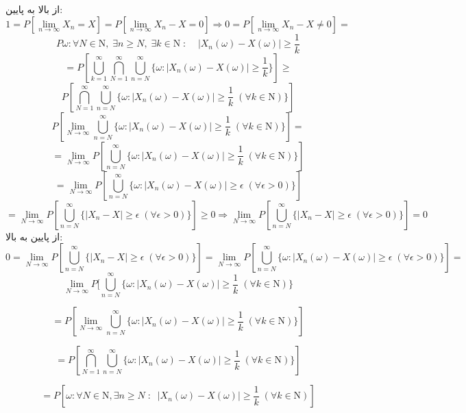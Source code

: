 از بالا به پایین:\small
\[
1= P[\lim_{n \longrightarrow \infty} X_n=X]=P[\lim_{n \longrightarrow \infty} X_n-X=0] \Longrightarrow 0=P[\lim_{n \longrightarrow \infty} X_n-X\neq0]=
\]
\[
P\omega :  \forall N \in \mathrm{N}, \;\exists n  \ge N,\;\exists k \in \mathrm{N}   \;:\;\;\;\;  |X_n(\omega)-X(\omega)|\ge \frac{1}{k}
\]
\[
=P[\bigcup_{k=1}^{\infty}\bigcap_{N=1}^{\infty}\bigcup_{n=N}^{\infty}\{ \omega: |X_n(\omega)-X(\omega)|\ge \frac{1}{k}\}]\ge
\]
\[
P[\bigcap_{N=1}^{\infty}\bigcup_{n=N}^{\infty}\{ \omega: |X_n
(\omega)-X(\omega)|\ge \frac{1}{k} \;(\forall k \in \mathrm{N})\}]
\]
\[
P[\lim_{N \longrightarrow \infty}\bigcup_{n=N}^{\infty} \{ \omega: |X_n(\omega)-X(\omega)|\ge \frac{1}{k} \;(\forall k \in \mathrm{N})\}]=
\]
\[
=\lim_{N \longrightarrow \infty}P[ \bigcup_{n=N}^{\infty}\{ \omega: |X_n(\omega)-X(\omega)|\ge \frac{1}{k} \;(\forall k \in \mathrm{N})\}]
\]
\[
=\lim_{N \longrightarrow \infty}P[\bigcup_{n=N}^{\infty} \{ \omega: |X_n(\omega)-X(\omega)|\ge \epsilon \;(\forall \epsilon >0)\}]
\]
\[
=\lim_{N \longrightarrow \infty}P[\bigcup_{n=N}^{\infty}\{|X_n-X|\ge \epsilon \;(\forall \epsilon >0)\}] \ge 0 \Longrightarrow \lim_{N \longrightarrow \infty}P[\bigcup_{n=N}^{\infty}\{|X_n-X|\ge \epsilon \;(\forall \epsilon >0)\}]=0
\]
از پایین به بالا:
\[
0=\lim_{N \longrightarrow \infty}P[\bigcup_{n=N}^{\infty}\{|X_n-X|\ge \epsilon \;(\forall \epsilon >0)\}]=\lim_{N \longrightarrow \infty}P[\bigcup_{n=N}^{\infty} \{ \omega: |X_n(\omega)-X(\omega)|\ge \epsilon \;(\forall \epsilon >0)\}]=
\]
\[
\lim_{N \longrightarrow \infty}P[ \bigcup_{n=N}^{\infty}\{ \omega: |X_n(\omega)-X(\omega)|\ge \frac{1}{k} \;(\forall k \in \mathrm{N})\}
\]

\[
=P[\lim_{N \longrightarrow \infty}\bigcup_{n=N}^{\infty} \{ \omega: |X_n(\omega)-X(\omega)|\ge \frac{1}{k} \;(\forall k \in \mathrm{N})\}]
\]

\[
= P[\bigcap_{N=1}^{\infty}\bigcup_{n=N}^{\infty}\{ \omega: |X_n
(\omega)-X(\omega)|\ge \frac{1}{k} \;(\forall k \in \mathrm{N})\}]
\]

\[
=P[\omega : \forall N \in \mathrm{N} , \exists n \ge N \; : \;\; |X_n(\omega)-X(\omega)|\ge \frac{1}{k}\;(\forall k \in \mathrm{N})]
\]

